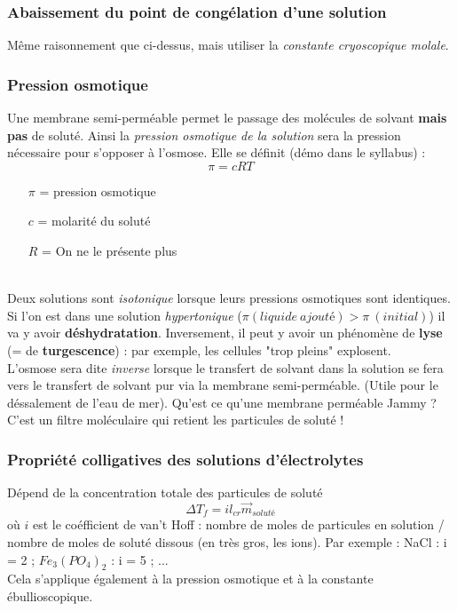 \documentclass[12pt, a4paper]{article}
\begin{document}
\subsubsection{Abaissement du point de congélation d'une solution}
Même raisonnement que ci-dessus, mais utiliser la \textit{constante cryoscopique molale}.

\subsubsection{Pression osmotique}
Une membrane semi-perméable permet le passage des molécules de solvant \textbf{mais pas} de soluté. Ainsi la \textit{pression osmotique de la solution} sera la pression nécessaire pour s'opposer à l'osmose. Elle se définit (démo dans le syllabus) : 
$$\pi = c R T$$
\begin{itemize}
\item[$\pi$] = pression osmotique
\item[$c$] = molarité du soluté
\item[$R$] = On ne le présente plus
\end{itemize}
\ \\
Deux solutions sont \textit{isotonique} lorsque leurs pressions osmotiques sont identiques.\\

Si l'on est dans une solution \textit{hypertonique} ($\pi(liquide\ ajouté) > \pi\ (initial)$) il va y avoir \textbf{déshydratation}. Inversement, il peut y avoir un phénomène de \textbf{lyse} (= de \textbf{turgescence}) : par exemple, les cellules "trop pleins" explosent.
\\

L'osmose sera dite \textit{inverse} lorsque le transfert de solvant dans la solution se fera vers le transfert de solvant pur via la membrane semi-perméable. (Utile pour le déssalement de l'eau de mer). 
Qu'est ce qu'une membrane perméable Jammy ? C'est un filtre moléculaire qui retient les particules de soluté !

\subsubsection{Propriété colligatives des solutions d'électrolytes}
Dépend de la concentration totale des particules de soluté
$$\Delta T_f = i l_{cr} \vec{m}_{soluté}$$
où $i$ est le coéfficient  de van't Hoff : nombre de moles de particules en solution / nombre de moles de soluté dissous (en très gros, les ions). Par exemple : NaCl : i = 2 ; $Fe_3(PO_4)_2$ : i = 5 ; ...\\
Cela s'applique également à la pression osmotique et à la constante ébullioscopique.
\end{document}
